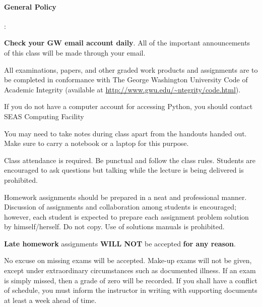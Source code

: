 \documentclass[10pt]{article}
\begin{document}
\paragraph*{General Policy}
\begin{list}
{:}
{\setlength{\itemsep}{-3pt}}

\item \textbf{Check your GW email account daily}. All of the important announcements of this class will be made through your email. 



\item All examinations, papers, and other graded work products and assignments are to be completed in conformance with The George Washington University Code of Academic Integrity (available at \url{http://www.gwu.edu/~ntegrity/code.html}).

\item If you do not have a computer account for accessing Python, you should contact SEAS Computing Facility

\item You may need to take notes during class apart from the handouts handed out. Make sure to carry a notebook or a laptop for this purpose.

\item Class attendance is required. Be punctual and follow the class rules. Students are encouraged to ask questions but talking while the lecture is being delivered is prohibited.

\item Homework assignments should be prepared in a neat and professional manner. Discussion of assignments and collaboration among students is  encouraged; however,  each student is expected to prepare each assignment problem solution by himself/herself. Do not copy. Use of solutions manuals is prohibited.

\item \textbf{Late homework} assignments \textbf{WILL NOT} be accepted \textbf{for any reason}.

\item No excuse on missing exams will be accepted. Make-up exams will not be given, except under extraordinary circumstances such as documented illness. If an exam is simply missed, then a grade of zero will be recorded. If you shall have a conflict of schedule, you must inform the instructor in writing with supporting documents at least a week ahead of time.


\end{list}
\end{document}
